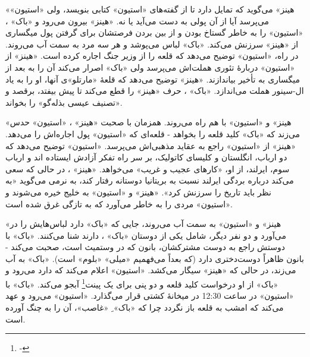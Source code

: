 \documentclass[12pt]{book}
\newcommand{\noun}[1]{«{#1}»}
\begin{document}
    \noun{هینز}  می‌گوید که تمایل دارد تا از گفته‌های \noun{استیون} کتابی بنویسد، ولی \noun{استیون} می‌پرسد آیا از آن پولی به دست می‌آید یا نه. \noun{هینز}  بیرون می‌رود و \noun{باک} ، \noun{استیون} را به خاطر گستاخ بودن و از بین بردن فرصتشان برای گرفتن پول میگساری از \noun{هینز}  سرزنش می‌کند. \noun{باک}  لباس می‌پوشد و هر سه مرد به سمت آب می‌روند. در راه، \noun{استیون} توضیح می‌دهد که قلعه را از وزیر جنگ اجاره کرده است. \noun{هینز}  از \noun{استیون} دربارۀ تئوری هملت‌اش می‌پرسد ولی \noun{باک}  اصرار می‌کند آن را به بعد از میگساری به تأخیر بیاندازند. \noun{هینز}  توضیح می‌دهد که قلعۀ \noun{مارتلو}ی آنها، او را به یاد ال-سینور هملت می‌اندازد. \noun{باک} ، حرف \noun{هینز}  را قطع می‌کند تا پیش بیفتد، برقصد و «تصنیف عیسی بذله‌گو» را بخواند.

    \noun{هینز}  و \noun{استیون} با هم راه می‌روند. همزمان با صحبت \noun{هینز} ، \noun{استیون} حدس می‌زند که \noun{باک}  کلید قلعه را بخواهد - قلعه‌ای که \noun{استیون} پول اجاره‌اش را می‌دهد. \noun{هینز}  از \noun{استیون} راجع به عقاید مذهبی‌اش می‌پرسد. \noun{استیون} توضیح می‌دهد که دو ارباب، انگلستان و کلیسای کاتولیک، بر سر راه تفکر آزادش ایستاده اند و ارباب سوم، ایرلند، از او، «کارهای عجیب و غریب» می‌خواهد. \noun{هینز} ، در حالی که سعی می‌کند درباره بردگی ایرلند نسبت به بریتانیا دوستانه رفتار کند، به نرمی می‌گوید «به نظر باید تاریخ را سرزنش کرد». \noun{هینز}  و \noun{استیون} به خلیج خیره می‌شوند و \noun{استیون} مردی را به خاطر می‌آورد که به تازگی غرق شده است.

    \noun{هینز}  و \noun{استیون} به سمت آب می‌روند، جایی که \noun{باک}  دارد لباس‌هایش را در می‌آورد و دو نفر دیگر، شامل یکی از دوستان \noun{باک} ، دارند شنا می‌کنند. \noun{باک}  با دوستش راجع به دوست مشترکشان، بانون که در وستمیث است، صحبت می‌کند - بانون ظاهراً دوست‌دختری دارد (که بعداً می‌فهمیم \noun{میلی} \noun{بلوم} است). \noun{باک}  به آب می‌زند، در حالی که \noun{هینز}  سیگار می‌کشد. \noun{استیون} اعلام می‌کند که دارد می‌رود و \noun{باک}  از او درخواست کلید قلعه و دو پنی برای یک پینت\footnote{-} آبجو می‌کند. \noun{باک}  با \noun{استیون} در ساعت 12:30 در میخانۀ کشتی قرار می‌گذارد. \noun{استیون} می‌رود و عهد می‌کند که امشب به قلعه باز نگردد چرا که \noun{باک} ِ «غاصب»، آن را به چنگ آورده است.
\end{document}
